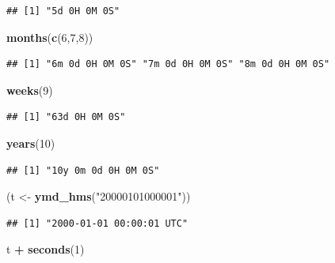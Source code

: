 \documentclass[]{book}
\newenvironment{Shaded}{\begin{snugshade}}{\end{snugshade}}
\newcommand{\KeywordTok}[1]{\textcolor[rgb]{0.13,0.29,0.53}{\textbf{#1}}}
\newcommand{\DecValTok}[1]{\textcolor[rgb]{0.00,0.00,0.81}{#1}}
\newcommand{\StringTok}[1]{\textcolor[rgb]{0.31,0.60,0.02}{#1}}
\newcommand{\OperatorTok}[1]{\textcolor[rgb]{0.81,0.36,0.00}{\textbf{#1}}}
\newcommand{\NormalTok}[1]{#1}
\theoremstyle{definition}
\theoremstyle{definition}
\theoremstyle{definition}
\theoremstyle{remark}
\begin{document}
\begin{verbatim}
## [1] "5d 0H 0M 0S"
\end{verbatim}

\begin{Shaded}
\begin{Highlighting}[]
\KeywordTok{months}\NormalTok{(}\KeywordTok{c}\NormalTok{(}\DecValTok{6}\NormalTok{,}\DecValTok{7}\NormalTok{,}\DecValTok{8}\NormalTok{))}
\end{Highlighting}
\end{Shaded}

\begin{verbatim}
## [1] "6m 0d 0H 0M 0S" "7m 0d 0H 0M 0S" "8m 0d 0H 0M 0S"
\end{verbatim}

\begin{Shaded}
\begin{Highlighting}[]
\KeywordTok{weeks}\NormalTok{(}\DecValTok{9}\NormalTok{)}
\end{Highlighting}
\end{Shaded}

\begin{verbatim}
## [1] "63d 0H 0M 0S"
\end{verbatim}

\begin{Shaded}
\begin{Highlighting}[]
\KeywordTok{years}\NormalTok{(}\DecValTok{10}\NormalTok{)}
\end{Highlighting}
\end{Shaded}

\begin{verbatim}
## [1] "10y 0m 0d 0H 0M 0S"
\end{verbatim}

\begin{Shaded}
\begin{Highlighting}[]
\NormalTok{(t <-}\StringTok{ }\KeywordTok{ymd_hms}\NormalTok{(}\StringTok{"20000101000001"}\NormalTok{))}
\end{Highlighting}
\end{Shaded}

\begin{verbatim}
## [1] "2000-01-01 00:00:01 UTC"
\end{verbatim}

\begin{Shaded}
\begin{Highlighting}[]
\NormalTok{t }\OperatorTok{+}\StringTok{ }\KeywordTok{seconds}\NormalTok{(}\DecValTok{1}\NormalTok{)}
\end{Highlighting}
\end{Shaded}
\end{document}

